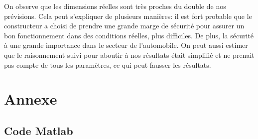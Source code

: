 \documentclass[a4paper,oneside,12pt]{report}
\begin{document}
On observe que les dimensions réelles sont très proches du double de nos prévisions. Cela peut s'expliquer de plusieurs manières: il est fort probable que le constructeur a choisi de prendre une grande marge de sécurité pour assurer un bon fonctionnement dans des conditions réelles, plus difficiles. De plus, la sécurité à une grande importance dans le secteur de l'automobile. On peut aussi estimer que le raisonnement suivi pour aboutir à nos résultats était simplifié et ne prenait pas compte de tous les paramètres, ce qui peut fausser les résultats.

\chapter{Annexe}

\section{Code Matlab}
\end{document}
